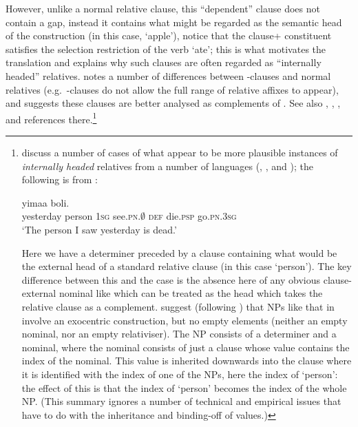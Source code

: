 \documentclass[output=paper,biblatex,babelshorthands,newtxmath,draftmode,colorlinks,citecolor=brown]{langscibook}
\begin{document}
However, unlike a normal relative clause, this ``dependent'' clause does not contain a gap,
instead it contains what might be regarded as the semantic head of the construction (in
this case,  `apple'), notice that the clause+ constituent satisfies
the selection restriction of the verb  `ate'; this is what motivates the
translation and explains why such clauses are often regarded as ``internally headed''
relatives.  \citet[303--317]{Kim16SyntacticStrKorean} notes a number of differences
between -clauses and normal relatives (e.g.\ -clauses do not allow the
full range of relative affixes to appear), and suggests these clauses are better analysed
as complements of . See also , , , and
references there.\footnote{\citet[232--236]{Pollard:Sag:94} discuss a number of cases of what
  appear to be more plausible instances of \emph{internally headed} relatives from a number of
  languages (, , and ); the following is from :%
\begin{exe}\ex\label{x:rc-135}
  \gll [ya indɛ mi wɛ gɔ]  yimaa   boli.\\
       \hphantom{[}yesterday person \textsc{1sg} see.\textsc{pn.$\emptyset$} \textsc{def} die.\textsc{psp} go.\textsc{pn.3sg}\\
  \glt `The person I saw yesterday is dead.' 
\end{exe}
Here we have a determiner  preceded by a clause containing what would be
the external head of a standard relative clause (in this case  `person'). The key
difference between this and the  case is the absence here of any obvious clause-external
nominal like  which can be treated as the head which takes the relative
clause as a complement.  \citet[234]{Pollard:Sag:94} suggest (following \citealt{Culy:90}) that NPs
like that in  involve an exocentric construction, but no empty elements
(neither an empty nominal, nor an empty relativiser). The NP consists of a determiner and
a nominal, where the nominal consists of just a clause whose  value contains
the index of the nominal. This  value is inherited downwards into the clause where it
is identified with the index of one of the NPs, here the index of 
`person': the effect of this is that the index of  `person' becomes
the index of the whole NP. (This summary ignores a number of technical and empirical issues that
have to do
with the inheritance and binding-off of  values.)
}
\end{document}

